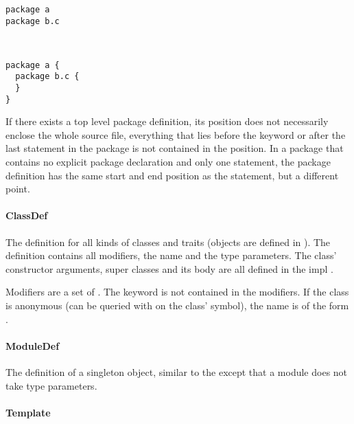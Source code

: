 \begin{multicols}{2}
\begin{lstlisting}
package a
package b.c
  
  
\end{lstlisting}

\begin{lstlisting}
package a {
  package b.c {
  }
}
\end{lstlisting}
\end{multicols}


If there exists a top level package definition, its position does not necessarily enclose the whole source file, everything that lies before the  keyword or after the last statement in the package is not contained in the position. In a package that contains no explicit package declaration and only one statement, the package definition has the same start and end position as the statement, but a different point.

\paragraph{ClassDef} 

\noindent The definition for all kinds of classes and traits (objects are defined in ). The definition contains all modifiers, the name and the type parameters. The class' constructor arguments, super classes and its body are all defined in the impl .

Modifiers are a set of . The  keyword is not contained in the modifiers. If the class is anonymous (can be queried with  on the class' symbol), the name is of the form .

\paragraph{ModuleDef} 

\noindent The definition of a singleton object, similar to the  except that a module does not take type parameters. 

\paragraph{Template} 

